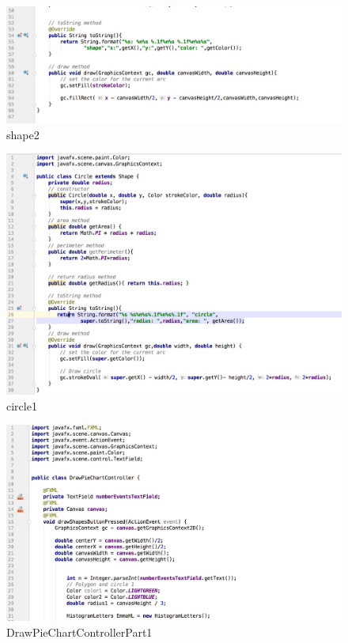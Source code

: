 \documentclass[a4paper,12pt]{article}
\begin{document}
\begin{figure}[H]
   \centering
   \includegraphics[width = 17cm]{shape2} %
   \caption{shape2}
   \label{shape2}
\end{figure}



\begin{figure}[H]
   \centering
   \includegraphics[width = 17cm]{circle1} %
   \caption{circle1}
   \label{circle1}
\end{figure}


\begin{figure}[H]
   \centering
   \includegraphics[width = 17cm]{DrawPieChartControllerPart1} %
   \caption{DrawPieChartControllerPart1}
   \label{DrawPieChartControllerPart1}
\end{figure}
\end{document}
